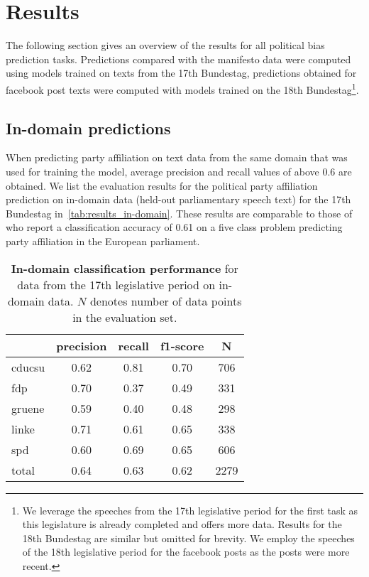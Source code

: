 \documentclass[11pt]{article}
\begin{document}
\section{Results}\label{sec:results}

The following section gives an overview of the results for all political bias prediction tasks. 
Predictions compared with the manifesto data were computed using models trained on texts from the 17th Bundestag, predictions obtained for facebook post texts were computed with models trained on the 18th Bundestag\footnote{We leverage the speeches from the 17th legislative period for the first task as this legislature is already completed and offers more data. Results for the 18th Bundestag are similar but omitted for brevity. We employ the speeches of the 18th legislative period for the facebook posts as the posts were more recent.}.

\subsection{In-domain predictions}

When predicting party affiliation on text data from the same domain that was used for training the model, average precision and recall values of above 0.6 are obtained. We list the evaluation results for the political party affiliation prediction on in-domain data (held-out parliamentary speech text) for the 17th Bundestag in~\autoref{tab:results_in-domain}.
These results are comparable to those of~\cite{Hirst2014} who report a classification accuracy of 0.61 on a five class problem predicting party affiliation in the European parliament.


\begin{table}[t]
\caption{
\label{tab:results_in-domain}
{\bf In-domain classification performance} for data from the 17th legislative period on in-domain data. $N$ denotes number of data points in the evaluation set.
}
\begin{center}
\begin{tabular}{lcccc}
    &         precision    &recall &  f1-score  & N  \\
\hline \hline
       cducsu   &    0.62  &    0.81  &    0.70  &     706\\
        fdp    &   0.70   &   0.37  &    0.49    &   331\\
     gruene &      0.59  &    0.40   &   0.48   &    298\\
      linke    &   0.71   &   0.61  &    0.65    &   338\\
        spd   &    0.60   &   0.69  &    0.65   &    606\\
\hline
 total &      0.64   &   0.63   &   0.62    &  2279 
%
\end{tabular}
\end{center}
\end{table}
\end{document}
